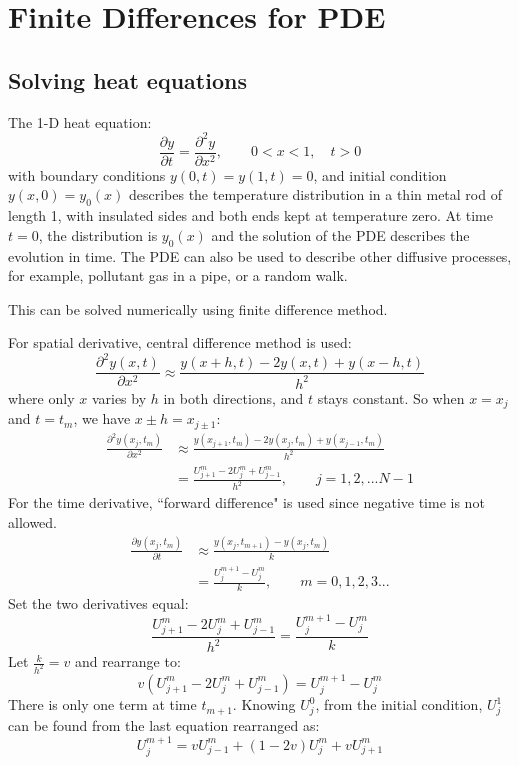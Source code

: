 \documentclass[a4paper, 12pt]{article}
\begin{document}
\newpage
\section{Finite Differences for PDE}

\subsection{Solving heat equations}
The 1-D heat equation: 
\[\frac{\partial y}{\partial t} = \frac{\partial^2 y}{\partial x^2}, \qquad 0<x<1, \quad t>0\]
with boundary conditions $y(0,t) = y(1,t) = 0$, and initial condition $y(x,0) = y_0(x)$ describes the temperature distribution in a thin metal rod of length 1, with insulated sides and both ends kept at temperature zero. At time $t = 0$, the distribution is $y_0(x)$ and the solution of the PDE describes the evolution in time. The PDE can also be used to describe other diffusive processes, for example, pollutant gas in a pipe, or a random walk.\cite{mathlecturenotes}

This can be solved numerically using finite difference method.

For spatial derivative, central difference method is used:
\[
      \frac{\partial^2 y(x,t)}{\partial x^2} \approx \frac{y(x+h,t)-2y(x,t)+y(x-h,t)}{h^2}      
\]
where only $x$ varies by $h$ in both directions, and $t$ stays constant. So when $x=x_j$ and $t=t_m$, we have $x \pm h = x_{j \pm 1}$:
\begin{align*}
      \frac{\partial^2 y(x_j,t_m)}{\partial x^2} &\approx \frac{y(x_{j+1},t_m)-2y(x_j,t_m)+y(x_{j-1},t_m)}{h^2}\\
      &= \frac{U_{j+1}^{m}-2U_{j}^{m}+U^m_{j-1}}{h^2}, \qquad j=1,2,...N-1
\end{align*}
For the time derivative, ``forward difference" is used since negative time is not allowed.
\begin{align*}
      \frac{\partial y(x_j,t_m)}{\partial t} &\approx \frac{y(x_j,t_{m+1})-y(x_j,t_m)}{k}\\
      &= \frac{U^{m+1}_j-U^m_j}{k}, \qquad m=0,1,2,3...
\end{align*}
Set the two derivatives equal:
\[
      \frac{U^m_{j+1}-2U^m_j+U^m_{j-1}}{h^2}=\frac{U^{m+1}_j - U^m_j}{k}
\]
Let $\frac{k}{h^2}=v$ and rearrange to:
\[
      v(U^m_{j+1}-2U^m_j+U^m_{j-1})=U^{m+1}_j - U^m_j
\]
There is only one term at time $t_{m+1}$. Knowing $U^0_j$, from the initial condition, $U^1_j$ can be found from the last equation rearranged as:
\[
      U^{m+1}_j=vU^m_{j-1}+(1-2v)U^m_j+vU^m_{j+1}
\]
\end{document}
